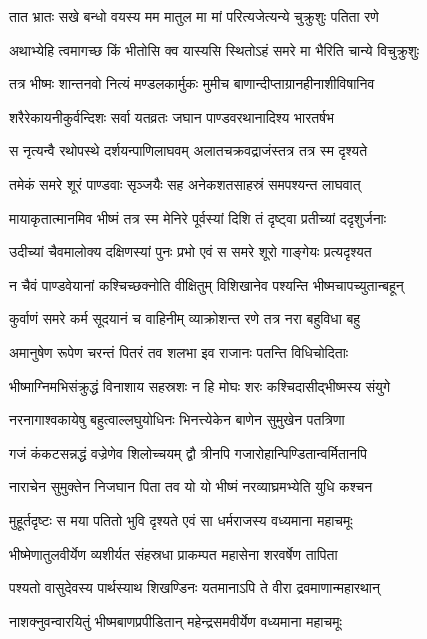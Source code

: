 \twolineshloka
{तात भ्रातः सखे बन्धो वयस्य मम मातुल}
{मा मां परित्यजेत्यन्ये चुक्रुशुः पतिता रणे}


\twolineshloka
{अथाभ्येहि त्वमागच्छ किं भीतोसि क्व यास्यसि}
{स्थितोऽहं समरे मा भैरिति चान्ये विचुक्रुशुः}


\twolineshloka
{तत्र भीष्मः शान्तनवो नित्यं मण्डलकार्मुकः}
{मुमीच बाणान्दीप्ताग्रानहीनाशीविषानिव}


\twolineshloka
{शरैरेकायनीकुर्वन्दिशः सर्वा यतव्रतः}
{जघान पाण्डवरथानादिश्य भारतर्षभ}


\twolineshloka
{स नृत्यन्वै रथोपस्थे दर्शयन्पाणिलाघवम्}
{अलातचक्रवद्राजंस्तत्र तत्र स्म दृश्यते}


\twolineshloka
{तमेकं समरे शूरं पाण्डवाः सृञ्जयैः सह}
{अनेकशतसाहस्रं समपश्यन्त लाघवात्}


\twolineshloka
{मायाकृतात्मानमिव भीष्मं तत्र स्म मेनिरे}
{पूर्वस्यां दिशि तं दृष्ट्वा प्रतीच्यां ददृशुर्जनाः}


\twolineshloka
{उदीच्यां चैवमालोक्य दक्षिणस्यां पुनः प्रभो}
{एवं स समरे शूरो गाङ्गेयः प्रत्यदृश्यत}


\twolineshloka
{न चैवं पाण्डवेयानां कश्चिच्छक्नोति वीक्षितुम्}
{विशिखानेव पश्यन्ति भीष्मचापच्युतान्बहून्}


\twolineshloka
{कुर्वाणं समरे कर्म सूदयानं च वाहिनीम्}
{व्याक्रोशन्त रणे तत्र नरा बहुविधा बहु}


\twolineshloka
{अमानुषेण रूपेण चरन्तं पितरं तव}
{शलभा इव राजानः पतन्ति विधिचोदिताः}


\twolineshloka
{भीष्माग्निमभिसंक्रुद्धं विनाशाय सहस्रशः}
{न हि मोघः शरः कश्चिदासीद्भीष्मस्य संयुगे}


\twolineshloka
{नरनागाश्वकायेषु बहुत्वाल्लघुयोधिनः}
{भिनत्त्येकेन बाणेन सुमुखेन पतत्रिणा}


\twolineshloka
{गजं कंकटसन्नद्धं वज्रेणेव शिलोच्चयम्}
{द्वौ त्रीनपि गजारोहान्पिण्डितान्वर्मितानपि}


\twolineshloka
{नाराचेन सुमुक्तेन निजघान पिता तव}
{यो यो भीष्मं नरव्याघ्रमभ्येति युधि कश्चन}


\twolineshloka
{मुहूर्तदृष्टः स मया पतितो भुवि दृश्यते}
{एवं सा धर्मराजस्य वध्यमाना महाचमूः}


\twolineshloka
{भीष्मेणातुलवीर्येण व्यशीर्यत संहस्रधा}
{प्राकम्पत महासेना शरवर्षेण तापिता}


\twolineshloka
{पश्यतो वासुदेवस्य पार्थस्याथ शिखण्डिनः}
{यतमानाऽपि ते वीरा द्रवमाणान्महारथान्}


\twolineshloka
{नाशक्नुवन्वारयितुं भीष्मबाणप्रपीडितान्}
{महेन्द्रसमवीर्येण वध्यमाना महाचमूः}


